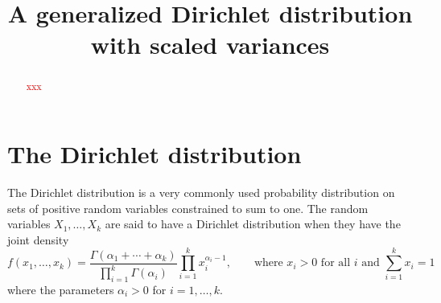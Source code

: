 \documentclass[ba]{imsart}
\numberwithin{equation}{section}
\theoremstyle{plain}
\newcommand{\falta}[1]{\textcolor{red}{#1}}
\begin{document}
\begin{frontmatter}
\title{A generalized Dirichlet distribution with scaled variances}


\begin{abstract}
\falta{xxx}
\end{abstract}

\begin{keyword}[class=MSC]
\kwd[Primary ]{\falta{60K35}}
\kwd{\falta{60K35}}
\kwd[; secondary ]{\falta{60K35}}
\end{keyword}

\begin{keyword}
\kwd{\falta{xxx}}
\kwd{\falta{xxx}}
\end{keyword}

\end{frontmatter}

\section{The Dirichlet distribution}

The Dirichlet distribution is a very commonly used probability
distribution on sets of positive random variables constrained to sum
to one.  The random variables $X_1,\ldots,X_k$ are said to have a
Dirichlet distribution when they have the joint density
$$
f(x_1,\ldots,x_k) = \frac{\Gamma(\alpha_1 + \cdots +
  \alpha_k)}{\prod_{i=1}^k \Gamma(\alpha_i)} \prod_{i=1}^k
x_i^{\alpha_i - 1}, \qquad \text{where $x_i > 0$ for all $i$ and
  $\sum_{i=1}^k x_i = 1$}
$$
where the parameters $\alpha_i > 0$ for $i=1,\ldots,k$.
\end{document}
